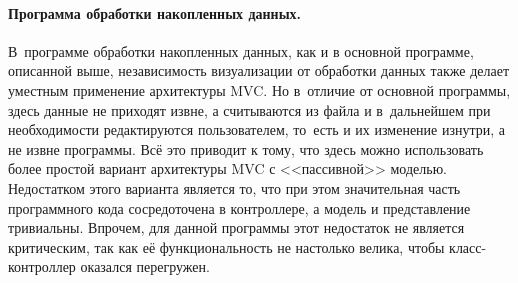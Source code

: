\documentclass[a4paper, 14pt]{extarticle}
\newenvironment{myfigure}[2]%
    {\pushQED{\caption{#1} \label{#2}} %
     \begin{figure}[!htb]\centering } %
    {  \popQED %
     \end{figure}}
\begin{document}
  \paragraph{Программа обработки накопленных данных.}

  В~программе обработки накопленных данных, как и в основной программе, описанной выше,
  независимость визуализации от обработки данных также делает уместным
  применение архитектуры MVC. Но в~отличие от основной программы, здесь данные не приходят извне, а
  считываются из файла и в~дальнейшем при необходимости редактируются пользователем, то~есть и их
  изменение изнутри, а не извне программы. Всё это приводит к тому, что здесь можно использовать
  более простой вариант архитектуры MVC с <<пассивной>> моделью. Недостатком этого варианта является
  то, что при этом значительная часть программного кода сосредоточена в контроллере, а модель и
  представление тривиальны. Впрочем, для данной программы этот недостаток не является критическим,
  так как её функциональность не настолько велика, чтобы класс-контроллер оказался перегружен.

\end{document}

